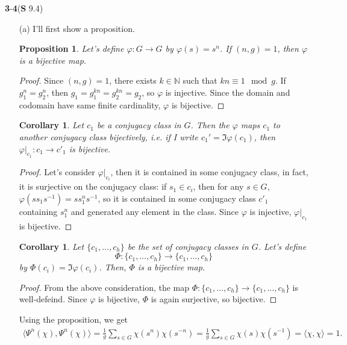 \documentclass[a4paper, 12pt]{article}
\theoremstyle{Mydefinition}
\theoremstyle{Mytheorem}
\newtheorem{corollary}[statement]{Corollary}
\newtheorem{proposition}[statement]{Proposition}
\begin{document}
\noindent \textbf{3}-\textbf{4}(\textbf{S} 9.4)
\begin{enumerate}
    \item[(a)]I'll first show a proposition.
\begin{proposition}\label{HW10:Prop:1}
Let's define $\varphi:G\rightarrow G$ by $\varphi(s) = s^n$. If $(n,g)=1$, then $\varphi$ is a bijective map.
\end{proposition}
\begin{proof}
Since $(n,g)=1$, there exists $k\in \mathbb{N}$ such that $kn\equiv 1\mod g$. If $g_1^n = g_2^n$, then $g_1=g_1^{kn}=g_2^{kn}=g_2$, so $\varphi$ is injective. Since the domain and codomain have same finite cardinality, $\varphi$ is bijective.
\end{proof}
\begin{corollary}\label{HW10:Cor:1}
Let $c_1$ be a conjugacy class in $G$. Then the $\varphi$ maps $c_1$ to another conjugacy class bijectively, i.e. if I write $c_1' = \Im\varphi(c_1)$, then $\varphi|_{c_1}:c_1\rightarrow c'_1$ is bijective.
\end{corollary}
\begin{proof}
Let's consider $\varphi|_{c_i}$, then it is contained in some conjugacy class, in fact, it is surjective on the conjugacy class: if $s_1\in c_i$, then for any $s\in G$, $\varphi(ss_1s^{-1}) = ss_1^ns^{-1}$, so it is contained in some conjugacy class $c'_1$ containing $s_1^n$ and generated any element in the class. Since $\varphi$ is injective, $\varphi|_{c_1}$ is bijective.
\end{proof}
\begin{corollary}\label{HW10:Cor:2}
Let $\{c_1, \ldots, c_h\}$ be the set of conjugacy classes in $G$. Let's define \begin{equation}
    \Phi:\{c_1, \ldots, c_h\}\rightarrow \{c_1, \ldots, c_h\}
\end{equation}
by $\Phi(c_i) = \Im\varphi(c_i)$. Then, $\Phi$ is a bijective map.
\end{corollary}
\begin{proof}
From the above consideration, the map $\Phi:\{c_1, \ldots, c_h\}\rightarrow \{c_1, \ldots, c_h\}$ is well-defeind. Since $\varphi$ is bijective, $\Phi$ is again surjective, so bijective.
\end{proof}
Using the proposition, we get
\begin{equation}
\begin{split}
    \langle \Psi^n(\chi),\Psi^n(\chi)\rangle = \frac{1}{g}\sum_{s\in G}\chi(s^n)\chi(s^{-n}) = \frac{1}{g}\sum_{s\in G}\chi(s)\chi(s^{-1}) = \langle \chi, \chi\rangle = 1.

\end{split}
\end{equation}
\end{enumerate}
\end{document}

